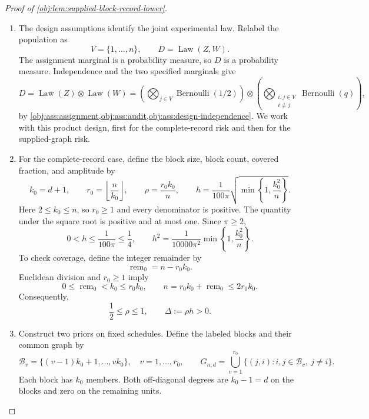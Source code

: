 \begin{proof}[Proof of \cref{obj:lem:supplied-block-record-lower}]
\begin{enumerate}
\item The design assumptions identify the joint experimental law. Relabel the population as
\[
V=\{1,\ldots,n\},
\qquad
D=\operatorname{Law}(Z,W).
\]
The assignment marginal is a probability measure, so \(D\) is a probability measure. Independence and the two specified marginals give
\[
D
=
\operatorname{Law}(Z)\otimes\operatorname{Law}(W)
=
\left(\bigotimes_{j\in V}\operatorname{Bernoulli}(1/2)\right)
\otimes
\left(\bigotimes_{\substack{i,j\in V\\i\ne j}}
\operatorname{Bernoulli}(q)\right),
\]
by \cref{obj:ass:assignment,obj:ass:audit,obj:ass:design-independence}.
We work with this product design, first for the complete-record risk and then for the supplied-graph risk.

\item For the complete-record case, define the block size, block count, covered fraction, and amplitude by
\[
k_0=d+1,
\qquad
r_0=\left\lfloor\frac{n}{k_0}\right\rfloor,
\qquad
\rho=\frac{r_0k_0}{n},
\qquad
h=\frac{1}{100\pi}
\sqrt{\min\left\{1,\frac{k_0^2}{n}\right\}}.
\]
Here \(2\le k_0\le n\), so \(r_0\ge1\) and every denominator is positive. The quantity under the square root is positive and at most one. Since \(\pi\ge2\),
\[
0<h\le\frac{1}{100\pi}\le\frac14,
\qquad
h^2=
\frac{1}{10000\pi^2}
\min\left\{1,\frac{k_0^2}{n}\right\}.
\]
To check coverage, define the integer remainder by
\[
\operatorname{rem}_0=n-r_0k_0.
\]
Euclidean division and \(r_0\ge1\) imply
\[
0\le\operatorname{rem}_0<k_0\le r_0k_0,
\qquad
n=r_0k_0+\operatorname{rem}_0\le2r_0k_0.
\]
Consequently,
\[
\frac12\le\rho\le1,
\qquad
\Delta:=\rho h>0.
\]

\item Construct two priors on fixed schedules. Define the labeled blocks and their common graph by
\[
\mathcal B_v=\{(v-1)k_0+1,\ldots,vk_0\},
\quad v=1,\ldots,r_0,
\qquad
G_{n,d}
=
\bigcup_{v=1}^{r_0}
\{(j,i):i,j\in\mathcal B_v,\ j\ne i\}.
\]
Each block has \(k_0\) members. Both off-diagonal degrees are \(k_0-1=d\) on the blocks and zero on the remaining units.


\end{enumerate}
\end{proof}
